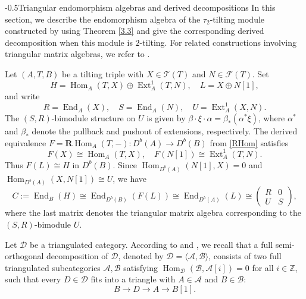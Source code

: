 \documentclass[reqno,12pt]{amsart}
\makeatletter
\numberwithin{equation}{section}
\theoremstyle{plain}
\theoremstyle{definition}
\renewcommand{\section}{\@startsection{section}{1}{0mm}
  {-\baselineskip}{0.5\baselineskip}{\bf\leftline}}
\makeatother
\begin{document}
\section{Triangular endomorphism algebras and derived decompositions}
In this section, we describe the endomorphism algebra of the \( \tau_{2} \)-tilting module constructed by using Theorem \ref{3.3} and give the corresponding
derived decomposition when this module is $2$-tilting.
For related constructions involving triangular matrix algebras, we refer to
\cite{LAD,LI}.

Let $(A,T,B)$ be a tilting triple with $X\in\mathcal{T}(T)$ and
$N\in\mathcal{F}(T)$. Set
\[
H=\operatorname{Hom}_A(T,X)\oplus\operatorname{Ext}_A^1(T,N),
\quad L=X\oplus N[1],
\]
and write
\[
R=\operatorname{End}_A(X),\quad S=\operatorname{End}_A(N),\quad
U=\operatorname{Ext}_A^1(X,N).
\]
The $(S,R)$-bimodule structure on $U$ is given by
$\beta\cdot\xi\cdot\alpha=\beta_*(\alpha^*\xi)$, where $\alpha^*$ and
$\beta_*$ denote the pullback and pushout of extensions, respectively.
The derived equivalence
$F=\mathbf{R}\operatorname{Hom}_A(T,-):D^b(A)\longrightarrow D^b(B)$
from \eqref{RHom} satisfies
\[
F(X)\cong\operatorname{Hom}_A(T,X),\quad
F(N[1])\cong\operatorname{Ext}_A^1(T,N).
\]
Thus $F(L)\cong H$ in $D^b(B)$. Since
$\operatorname{Hom}_{D^b(A)}(N[1],X)=0$ and
$\operatorname{Hom}_{D^b(A)}(X,N[1])\cong U$, we have
\begin{equation}\label{triangular-algebra}
C:=\operatorname{End}_B(H)
\cong\operatorname{End}_{D^b(B)}(F(L))
\cong\operatorname{End}_{D^b(A)}(L)
\cong\begin{pmatrix}R&0\\U&S\end{pmatrix},
\end{equation}
where the last matrix denotes the triangular matrix algebra corresponding to the $(S,R)$-bimodule $U$.

Let $\mathcal{D}$ be a triangulated category. According to \cite[Definition~2.3]{KUZ} and \cite[Section~4]{BOK}, we recall that a full semi-orthogonal decomposition of
$\mathcal D$, denoted by $\mathcal D=\langle\mathcal A,\mathcal B\rangle$, consists of two full
triangulated subcategories $\mathcal A,\mathcal B$ satisfying
$\operatorname{Hom}_{\mathcal D}(\mathcal B,\mathcal A[i])=0$ for all
$i\in\mathbb Z$, such that every $D\in\mathcal{D}$ fits into a triangle with $A\in\mathcal A$ and $B\in\mathcal B$:
\[
B\longrightarrow D\longrightarrow A\longrightarrow B[1].
\]
\end{document}
